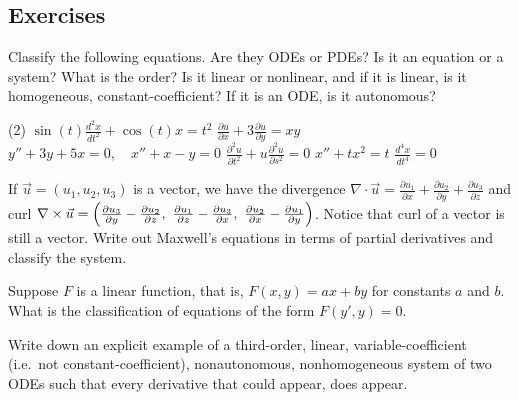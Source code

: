 \pagebreak[3]
\subsection{Exercises}

\begin{exercise}
Classify the following equations.  Are they ODEs or PDEs?  Is it an equation
or a system?  What is the order?  Is it linear or nonlinear, and if it is
linear, is it homogeneous, constant-coefficient?  If it is an ODE\@, is it
autonomous?
\begin{tasks}(2)
\task $\displaystyle \sin(t) \frac{d^2 x}{dt^2} + \cos(t) x = t^2$
\task $\displaystyle \frac{\partial u}{\partial x} + 3 \frac{\partial u}{\partial y} = xy$
\task $\displaystyle y''+3y+5x=0, \quad x''+x-y=0$
\task $\displaystyle \frac{\partial^2 u}{\partial t^2} + u\frac{\partial^2 u}{\partial s^2} =
0$
\task $\displaystyle x''+tx^2=t$
\task $\displaystyle \frac{d^4 x}{dt^4} = 0$
\end{tasks}
\end{exercise}

\begin{exercise}
If $\vec{u} = (u_1,u_2,u_3)$ is a vector, we have the divergence
$\nabla \cdot \vec{u} =
\frac{\partial u_1}{\partial x} +
\frac{\partial u_2}{\partial y} +
\frac{\partial u_3}{\partial z}$ and curl
$\nabla \times \vec{u} =
\Bigl(
\frac{\partial u_3}{\partial y} - \frac{\partial u_2}{\partial z} , ~
\frac{\partial u_1}{\partial z} - \frac{\partial u_3}{\partial x} , ~
\frac{\partial u_2}{\partial x} - \frac{\partial u_1}{\partial y} \Bigr)$.
Notice that curl of a vector is still a vector.  Write out Maxwell's
equations in terms of partial derivatives and classify the system.
\end{exercise}

\begin{exercise}
Suppose $F$ is a linear function, that is,
$F(x,y) = ax+by$ for constants $a$ and $b$.  What is the
classification of equations of the form $F(y',y) = 0$.
\end{exercise}

\begin{exercise}
Write down an explicit example of a third-order, linear,
variable-coefficient (i.e.\ not constant-coefficient),
nonautonomous, nonhomogeneous system of two ODEs such that every derivative
that could appear, does appear.
\end{exercise}

\setcounter{exercise}{100}


